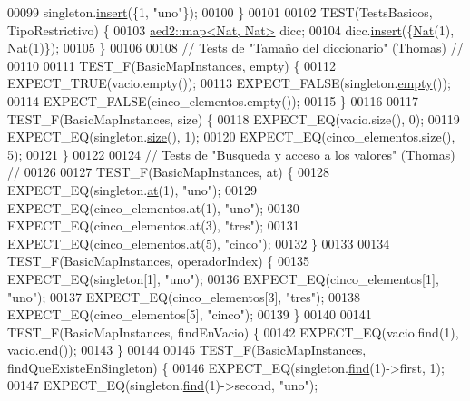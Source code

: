\begin{DoxyCode}
00099     singleton.\hyperlink{classaed2_1_1map_a6941cde9a79c27f054b5c97a587a1854_a6941cde9a79c27f054b5c97a587a1854}{insert}(\{1, \textcolor{stringliteral}{"uno"}\});
00100 \}
00101 
00102 TEST(TestsBasicos, TipoRestrictivo) \{
00103     \hyperlink{classaed2_1_1map}{aed2::map<Nat, Nat>} dicc;
00104     dicc.\hyperlink{classaed2_1_1map_a6941cde9a79c27f054b5c97a587a1854_a6941cde9a79c27f054b5c97a587a1854}{insert}(\{\hyperlink{classNat}{Nat}(1), \hyperlink{classNat}{Nat}(1)\});
00105 \}
00106 
00108 \textcolor{comment}{// Tests de "Tamaño del diccionario" (Thomas) //}
00110 \textcolor{comment}{}
00111 TEST\_F(BasicMapInstances, empty) \{
00112     EXPECT\_TRUE(vacio.empty());
00113     EXPECT\_FALSE(singleton.\hyperlink{classaed2_1_1map_af5320ca0a7df4d16015441d5d055a7ee_af5320ca0a7df4d16015441d5d055a7ee}{empty}());
00114     EXPECT\_FALSE(cinco\_elementos.empty());
00115 \}
00116 
00117 TEST\_F(BasicMapInstances, size) \{
00118     EXPECT\_EQ(vacio.size(), 0);
00119     EXPECT\_EQ(singleton.\hyperlink{classaed2_1_1map_a89f2613f926ac13293eafe65889d6021_a89f2613f926ac13293eafe65889d6021}{size}(), 1);
00120     EXPECT\_EQ(cinco\_elementos.size(), 5);
00121 \}
00122 
00124 \textcolor{comment}{// Tests de "Busqueda y acceso a los valores" (Thomas) //}
00126 \textcolor{comment}{}
00127 TEST\_F(BasicMapInstances, at) \{
00128     EXPECT\_EQ(singleton.\hyperlink{classaed2_1_1map_a0b0a11f906da2926f9eb342fcee79fd7_a0b0a11f906da2926f9eb342fcee79fd7}{at}(1), \textcolor{stringliteral}{"uno"});
00129     EXPECT\_EQ(cinco\_elementos.at(1), \textcolor{stringliteral}{"uno"});
00130     EXPECT\_EQ(cinco\_elementos.at(3), \textcolor{stringliteral}{"tres"});
00131     EXPECT\_EQ(cinco\_elementos.at(5), \textcolor{stringliteral}{"cinco"});
00132 \}
00133 
00134 TEST\_F(BasicMapInstances, operadorIndex) \{
00135     EXPECT\_EQ(singleton[1], \textcolor{stringliteral}{"uno"});
00136     EXPECT\_EQ(cinco\_elementos[1], \textcolor{stringliteral}{"uno"});
00137     EXPECT\_EQ(cinco\_elementos[3], \textcolor{stringliteral}{"tres"});
00138     EXPECT\_EQ(cinco\_elementos[5], \textcolor{stringliteral}{"cinco"});
00139 \}
00140 
00141 TEST\_F(BasicMapInstances, findEnVacio) \{
00142     EXPECT\_EQ(vacio.find(1), vacio.end());
00143 \}
00144 
00145 TEST\_F(BasicMapInstances, findQueExisteEnSingleton) \{
00146     EXPECT\_EQ(singleton.\hyperlink{classaed2_1_1map_afd0fc1a8234888e61e0e615de7e245b8_afd0fc1a8234888e61e0e615de7e245b8}{find}(1)->first, 1);
00147     EXPECT\_EQ(singleton.\hyperlink{classaed2_1_1map_afd0fc1a8234888e61e0e615de7e245b8_afd0fc1a8234888e61e0e615de7e245b8}{find}(1)->second, \textcolor{stringliteral}{"uno"});

\end{DoxyCode}
